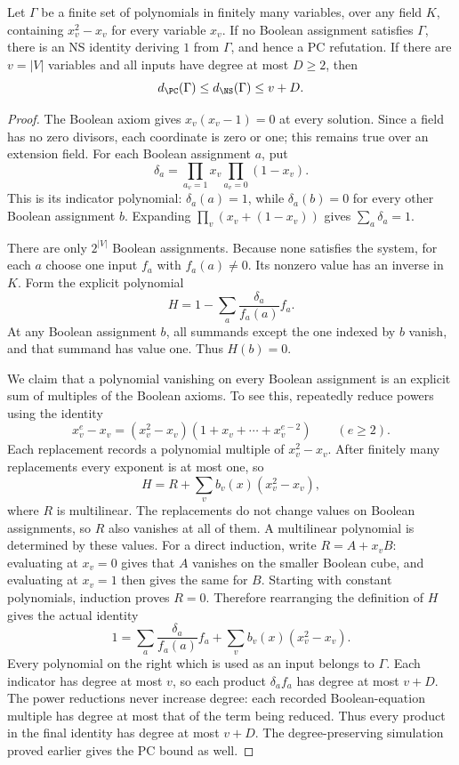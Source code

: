 \begin{proposition}\label{tx:prop:boolean-completeness}
Let $\Gamma$ be a finite set of polynomials in finitely many variables,
over any field $K$, containing $x_v^2-x_v$ for every variable $x_v$.
If no Boolean assignment satisfies $\Gamma$, there is an NS identity
deriving $1$ from $\Gamma$, and hence a PC refutation. If there are
$v=|V|$ variables and all inputs have degree at most $D\ge2$, then
\[
                  d_{\PC}(\Gamma)\le d_{\NS}(\Gamma)\le v+D.
\]
\end{proposition}
\begin{proof}
The Boolean axiom gives $x_v(x_v-1)=0$ at every solution. Since a field
has no zero divisors, each coordinate is zero or one; this remains true
over an extension field. For each Boolean assignment $a$, put
\[
           \delta_a=\prod_{a_v=1}x_v\prod_{a_v=0}(1-x_v).
\]
This is its indicator polynomial: $\delta_a(a)=1$, while
$\delta_a(b)=0$ for every other Boolean assignment $b$. Expanding
$\prod_v(x_v+(1-x_v))$ gives $\sum_a\delta_a=1$.

There are only $2^{|V|}$ Boolean assignments. Because none satisfies the
system, for each $a$ choose one input $f_a$ with $f_a(a)\ne0$. Its
nonzero value has an inverse in $K$. Form the explicit polynomial
\[
                  H=1-\sum_a\frac{\delta_a}{f_a(a)}f_a.
\]
At any Boolean assignment $b$, all summands except the one indexed by
$b$ vanish, and that summand has value one. Thus $H(b)=0$.

We claim that a polynomial vanishing on every Boolean assignment is
an explicit sum of multiples of the Boolean axioms. To see this,
repeatedly reduce powers using the identity
\[
 x_v^e-x_v=(x_v^2-x_v)(1+x_v+\cdots+x_v^{e-2})\qquad(e\ge2).
\]
Each replacement records a polynomial multiple of $x_v^2-x_v$.
After finitely many replacements every exponent is at most one, so
\[
                  H=R+\sum_v b_v(x)(x_v^2-x_v),
\]
where $R$ is multilinear. The replacements do not change values on
Boolean assignments, so $R$ also vanishes at all of them. A multilinear
polynomial is determined by these values. For a direct induction, write
$R=A+x_v B$: evaluating at $x_v=0$ gives that $A$ vanishes on the
smaller Boolean cube, and evaluating at $x_v=1$ then gives the same for
$B$. Starting with constant polynomials, induction proves $R=0$.
Therefore rearranging the definition of $H$ gives the actual identity
\[
       1=\sum_a\frac{\delta_a}{f_a(a)}f_a
                            +\sum_v b_v(x)(x_v^2-x_v).
\]
Every polynomial on the right which is used as an input belongs to
$\Gamma$. Each indicator has degree at most $v$, so each product
$\delta_a f_a$ has degree at most $v+D$. The power reductions never
increase degree: each recorded Boolean-equation multiple has degree
at most that of the term being reduced. Thus every product in the
final identity has degree at most $v+D$. The degree-preserving
simulation proved earlier gives the PC bound as well.
\end{proof}

